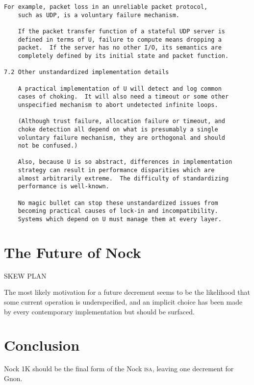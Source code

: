 \documentclass[twoside]{article}
\begin{document}
\begin{lstlisting}[label=lst:u,caption={U: Definition.  The earliest extant Nock.  Only layout has been changed for print.},style=listingcode]
    For example, packet loss in an unreliable packet protocol,
    such as UDP, is a voluntary failure mechanism.

    If the packet transfer function of a stateful UDP server is
    defined in terms of U, failure to compute means dropping a
    packet.  If the server has no other I/O, its semantics are
    completely defined by its initial state and packet function.

7.2 Other unstandardized implementation details

    A practical implementation of U will detect and log common
    cases of choking.  It will also need a timeout or some other
    unspecified mechanism to abort undetected infinite loops.

    (Although trust failure, allocation failure or timeout, and
    choke detection all depend on what is presumably a single
    voluntary failure mechanism, they are orthogonal and should
    not be confused.)

    Also, because U is so abstract, differences in implementation
    strategy can result in performance disparities which are
    almost arbitrarily extreme.  The difficulty of standardizing
    performance is well-known.

    No magic bullet can stop these unstandardized issues from
    becoming practical causes of lock-in and incompatibility.
    Systems which depend on U must manage them at every layer.
\end{lstlisting}


\section{The Future of Nock}

SKEW
PLAN


The most likely motivation for a future decrement seems to be the likelihood that some current operation is underspecified, and an implicit choice has been made by every contemporary implementation but should be surfaced.


\section{Conclusion}



Nock 1K should be the final form of the Nock \textsc{isa}, leaving one decrement for Gnon.

\printbibliography
\end{document}
